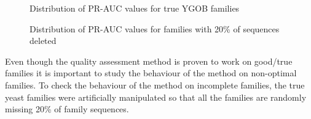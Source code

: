\documentclass{article}
\begin{document}
		\begin{figure}
			\caption{Distribution of PR-AUC values for true YGOB families}
			\label{fig:hist_pr-auc_true_ygob}
		\end{figure}
		
		\begin{figure}
			\caption{Distribution of PR-AUC values for families with 20\% of sequences deleted}
			\label{fig:hist_pr-auc_delete_ygob}
		\end{figure}
		
		Even though the quality assessment method is proven to work on good/true families it is important to study the behaviour of the method on non-optimal families. To check the behaviour of the method on incomplete families, the true yeast families were artificially manipulated so that all the families are randomly missing 20\% of family sequences.
		
\end{document}

